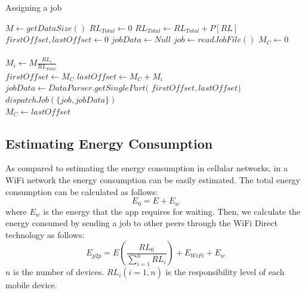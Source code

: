 \documentclass{sig-alternate}[10pt]
\begin{document}
\begin{CCSXML}
\begin{algorithm}
\caption{Assigning a job}
\label{alg:assign_job}
\begin{algorithmic}[1]
\begin{scriptsize}
\State $M \leftarrow {getDataSize()}$
\State $RL_{Total} \leftarrow 0$ 
  \State $RL_{Total} \leftarrow RL_{Total} + P[RL]$
\EndFor
\\
\State $firstOffset, lastOffset \leftarrow 0$
\State $jobData \leftarrow Null$
\State $job \leftarrow {readJobFile()}$
\State $M_{C} \leftarrow 0$
\\
\\
  \State $M_{i} \leftarrow M\frac{RL_{i}}{RL_{Total}}$\\
  \State $firstOffset \leftarrow M_{C} $
  \State $lastOffset \leftarrow M_{C} + M_{i}$
  \State $jobData \leftarrow DataParser.getSinglePart($
  \State 
		\hspace{\algorithmicindent}
		\hspace{\algorithmicindent}
		\hspace{\algorithmicindent}
		\hspace{\algorithmicindent}
		\hspace{\algorithmicindent}
						$firstOffset, lastOffset)$
  \State $dispatchJob(\{job, jobData\})$\\
  \State $M_{C} \leftarrow lastOffset$
  
\EndFor

\EndFunction
\end{scriptsize}
\end{algorithmic}
\end{algorithm}

\subsection{Estimating Energy Consumption}
As compared to estimating the energy consumption in cellular networks, in a WiFi network the energy consumption can be easily estimated. The total energy consumption can be calculated as follows:
$$E_{0} = E + E_{w}$$
\noindent where $E_{w}$ is the energy that the app requires for waiting. Then, we calculate the energy consumed by sending a job to other peers through the WiFi Direct technology as follows:
$$E_{p2p} = E(\frac{RL_{0}}{\sum_{i = 1}^{n}{RL_{i}}}) + E_{WiFi} + E_{w}$$ 
\noindent $n$ is the number of devices. $RL_{i} (i = \overline{1,n})$ is the responsibility level of each mobile device. 


\end{CCSXML}
\end{document}
